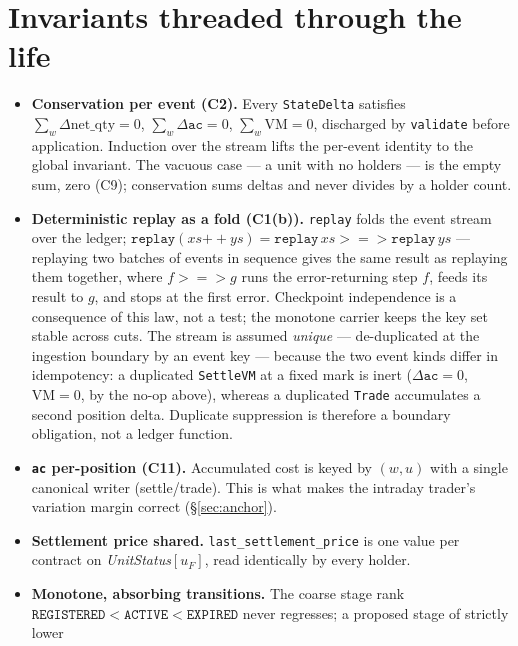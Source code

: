 \documentclass[11pt]{article}
\newcommand{\ac}{\texttt{ac}}
\newcommand{\netq}{\mathrm{net\_qty}}
\newcommand{\code}[1]{\texttt{#1}}
\newcommand{\unit}{u_{F}}
\begin{document}
\section{Invariants threaded through the life}
\label{sec:invariants}

\begin{itemize}
\item \textbf{Conservation per event (C2).} Every \code{StateDelta} satisfies
$\sum_w\Delta\netq=0$, $\sum_w\Delta\ac=0$, $\sum_w\mathrm{VM}=0$, discharged by \code{validate}
before application. Induction over the stream lifts the per-event identity to the global invariant.
The vacuous case --- a unit with no holders --- is the empty sum, zero (C9); conservation sums
deltas and never divides by a holder count.
\item \textbf{Deterministic replay as a fold (C1(b)).} \code{replay} folds the
event stream over the ledger; $\code{replay}(xs\mathbin{+\!\!+}ys)=\code{replay}\,xs \mathbin{>\!=\!>}
\code{replay}\,ys$ --- replaying two batches of events in sequence gives the same result as replaying
them together, where $f \mathbin{>\!=\!>} g$ runs the error-returning step
$f$, feeds its result to $g$, and stops at the first error. Checkpoint independence is a consequence of
this law, not a test; the monotone
carrier keeps the key set stable across cuts. The stream is assumed \emph{unique} --- de-duplicated at
the ingestion boundary by an event key --- because the two event kinds differ in idempotency: a
duplicated \code{SettleVM} at a fixed mark is inert ($\Delta\ac=0$, $\mathrm{VM}=0$, by the no-op
above), whereas a duplicated \code{Trade} accumulates a second position delta. Duplicate suppression is
therefore a boundary obligation, not a ledger function.
\item \textbf{\ac{} per-position (C11).} Accumulated cost is keyed by $(w,u)$ with a single canonical
writer (settle/trade). This is what makes the intraday trader's variation margin correct
(\S\ref{sec:anchor}).
\item \textbf{Settlement price shared.} \code{last\_settlement\_price} is one value per contract on
\emph{UnitStatus}$[\unit]$, read identically by every holder.
\item \textbf{Monotone, absorbing transitions.} The coarse stage rank
$\code{REGISTERED}<\code{ACTIVE}<\code{EXPIRED}$ never regresses; a proposed stage of strictly lower

\end{itemize}
\end{document}
